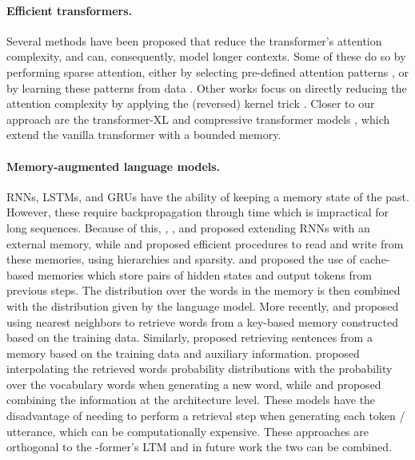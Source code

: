 \documentclass[11pt]{article}
\begin{document}
\paragraph{Efficient transformers. }
Several methods have been proposed that reduce the transformer's attention complexity, and can, consequently, model longer contexts. Some of these do so by performing sparse attention, either by selecting pre-defined attention patterns \citep{child2019generating,beltagy2020longformer,zaheer2020big}, or by learning these patterns from data \citep{kitaev2020reformer,vyas2020fast,tay2020sparse,roy2021efficient,wang2021cluster}. 
Other works focus on directly reducing the attention complexity by 
applying the (reversed) kernel trick 
\citep{katharopoulos2020transformers,choromanski2020rethinking,peng2021random,jaegle2021perceiver}. 
Closer to our approach are the transformer-XL and compressive transformer models \citep{dai2019transformer, rae2019compressive}, which extend the vanilla transformer with a bounded memory.

\paragraph{Memory-augmented language models. }
RNNs, LSTMs, and GRUs \citep{hochreiter1997long,cho2014properties} have the ability of keeping a memory state of the past.  However, these require backpropagation through time which is impractical for long sequences.
Because of this, \citet{graves2014neural}, \citet{weston2014memory}, \citet{joulin2015inferring} and \citet{grefenstette2015learning} proposed extending RNNs with an external memory, while \citet{chandar2016hierarchical} and \citet{rae2016scaling} proposed efficient procedures to read and write from these memories, using hierarchies and sparsity.
\citet{grave2016improving} and \citet{merity2016pointer} proposed the use of cache-based memories which store pairs of hidden states and output tokens from previous steps. The distribution over the words in the memory is then combined with the distribution given by the language model.
More recently, \citet{khandelwal2019generalization} and \citet{yogatama2021adaptive} proposed using nearest neighbors to retrieve words from a key-based memory constructed based on the training data. Similarly, \citet{fan2021augmenting} proposed retrieving sentences from a memory based on the training data and auxiliary information. \citet{khandelwal2019generalization} proposed interpolating the retrieved words probability distributions with the probability over the vocabulary words when generating a new word, while \citet{yogatama2021adaptive} and \citet{fan2021augmenting} proposed combining the information at the architecture level. 
These models have the disadvantage of needing to perform a retrieval step when generating each token / utterance, which can be computationally expensive. 
These approaches are orthogonal to the \mbox{-former}'s LTM and in future work the two can be combined.
\end{document}
